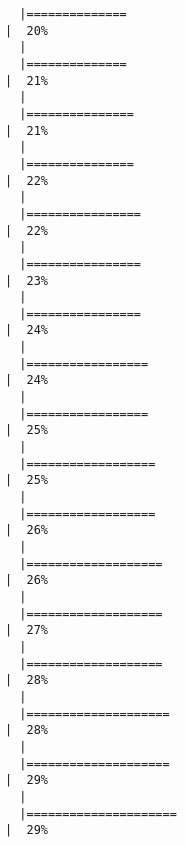 \documentclass[
  letterpaper,
]{book}
\begin{document}
\begin{verbatim}
  |==============                                                        |  20%
  |                                                                            
  |==============                                                        |  21%
  |                                                                            
  |===============                                                       |  21%
  |                                                                            
  |===============                                                       |  22%
  |                                                                            
  |================                                                      |  22%
  |                                                                            
  |================                                                      |  23%
  |                                                                            
  |================                                                      |  24%
  |                                                                            
  |=================                                                     |  24%
  |                                                                            
  |=================                                                     |  25%
  |                                                                            
  |==================                                                    |  25%
  |                                                                            
  |==================                                                    |  26%
  |                                                                            
  |===================                                                   |  26%
  |                                                                            
  |===================                                                   |  27%
  |                                                                            
  |===================                                                   |  28%
  |                                                                            
  |====================                                                  |  28%
  |                                                                            
  |====================                                                  |  29%
  |                                                                            
  |=====================                                                 |  29%

\end{verbatim}
\end{document}
